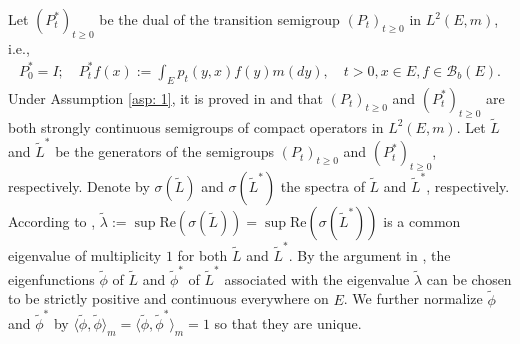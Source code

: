 \documentclass[12pt,a4paper]{amsart}
\theoremstyle{definition}
\numberwithin{equation}{section}
\begin{document}
Let $(P_t^*)_{t\geq 0}$ be the dual of the transition semigroup $(P_t)_{t\geq 0}$ in $L^2(E, m)$, i.e.,
\begin{align}
  P_0^* = I;
  \quad P_t^* f(x) := \int_E p_t(y,x) f(y) m(dy),
  \quad t > 0, x\in E, f\in \mathscr B_b(E).
\end{align}
Under Assumption \ref{asp: 1}, it is proved in \cite{RenSongZhang2015Limit} and \cite{RenSongZhang2017Central} that $(P_t)_{t \geq 0}$ and $(P^*_t)_{t \geq 0}$ are both strongly continuous semigroups of compact operators in $L^2(E,m)$.
Let $\widetilde L$ and $\widetilde L^*$ be the generators of the semigroups $(P_t)_{t \geq 0}$ and $(P^*_t)_{t \geq 0}$, respectively.
Denote by $\sigma(\widetilde L)$ and $\sigma(\widetilde L^*)$ the spectra of $\widetilde L$ and $\widetilde L^*$, respectively.
According to \cite[Theorem V.6.6]{Schaefer1974Banach},
$\widetilde \lambda := \sup \text{Re}(\sigma(\widetilde L)) = \sup \text{Re}(\sigma(\widetilde L^*))$ is a common eigenvalue of multiplicity $1$ for both $\widetilde L$ and $\widetilde L^*$.
By the argument in \cite{RenSongZhang2015Limit},
the eigenfunctions $\widetilde \phi$ of $\widetilde L$ and $\widetilde \phi^*$ of $\widetilde L^*$ associated with the eigenvalue $\widetilde \lambda$ can be chosen to be strictly positive and continuous everywhere on $E$.
We further normalize $\widetilde \phi$ and $\widetilde \phi^*$ by $\big\langle \widetilde \phi, \widetilde \phi \big\rangle_m = \big\langle \widetilde \phi, \widetilde \phi^*\big\rangle_m = 1$ so that they are unique.
\end{document}
